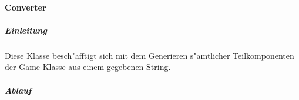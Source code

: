 \paragraph{Converter}
\label{par:converter}

\subparagraph{Einleitung}
Diese Klasse besch"afftigt sich mit dem Generieren s"amtlicher Teilkomponenten der Game-Klasse aus einem gegebenen String. 

\subparagraph{Ablauf}
\label{spar:converter_ablauf}
